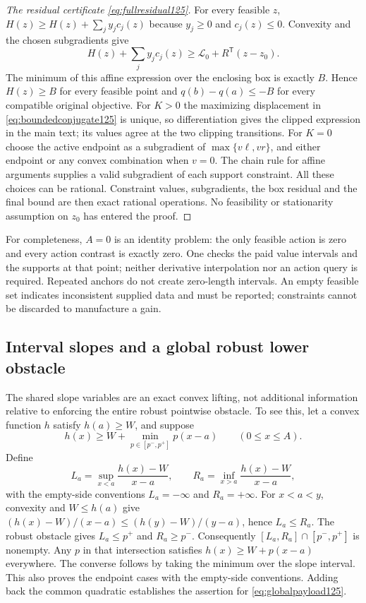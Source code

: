 \begin{proof}[The residual certificate \eqref{eq:fullresidual125}]
For every feasible $z$, $H(z)\ge H(z)+\sum_jy_jc_j(z)$
because $y_j\ge0$ and $c_j(z)\le0$. Convexity and the chosen
subgradients give
\[
 H(z)+\sum_jy_jc_j(z)\ge \mathcal L_0+R^{\mathsf T}(z-z_0).
\]
The minimum of this affine expression over the enclosing box is
exactly $B$. Hence $H(z)\ge B$ for every feasible point and
$q(b)-q(a)\le-B$ for every compatible original objective.
For $K>0$ the maximizing displacement in
\eqref{eq:boundedconjugate125} is unique, so differentiation gives
the clipped expression in the main text; its values agree at the
two clipping transitions. For $K=0$ choose the active endpoint
as a subgradient of $\max\{v\ell,vr\}$, and either endpoint or
any convex combination when $v=0$. The chain rule for affine
arguments supplies a valid subgradient of each support constraint.
All these choices can be rational. Constraint values, subgradients,
the box residual and the final bound are then exact rational
operations. No feasibility or stationarity assumption on $z_0$
has entered the proof.
\end{proof}

For completeness, $A=0$ is an identity problem: the only feasible
action is zero and every action contrast is exactly zero. One
checks the paid value intervals and the supports at that point;
neither derivative interpolation nor an action query is required.
Repeated anchors do not create zero-length intervals. An empty
feasible set indicates inconsistent supplied data and must be
reported; constraints cannot be discarded to manufacture a gain.

\subsection{Interval slopes and a global robust lower obstacle}

The shared slope variables are an exact convex lifting, not additional
information relative to enforcing the entire robust pointwise obstacle.
To see this, let a convex function $h$ satisfy $h(a)\ge W$, and
suppose
\[
 h(x)\ge W+\min_{p\in[p^-,p^+]}p(x-a)
                 \qquad(0\le x\le A).
\]
Define
\[
 L_a=\sup_{x<a}\frac{h(x)-W}{x-a},\qquad
 R_a=\inf_{x>a}\frac{h(x)-W}{x-a},
\]
with the empty-side conventions $L_a=-\infty$ and $R_a=+\infty$.
For $x<a<y$, convexity and $W\le h(a)$ give
$(h(x)-W)/(x-a)\le(h(y)-W)/(y-a)$, hence $L_a\le R_a$.
The robust obstacle gives $L_a\le p^+$ and $R_a\ge p^-$.
Consequently $[L_a,R_a]\cap[p^-,p^+]$ is nonempty. Any $p$
in that intersection satisfies $h(x)\ge W+p(x-a)$ everywhere.
The converse follows by taking the minimum over the slope interval.
This also proves the endpoint cases with the empty-side conventions.
Adding back the common quadratic establishes the assertion for
\eqref{eq:globalpayload125}.

